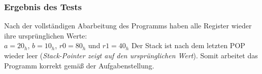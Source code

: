 \subsubsection{Ergebnis des Tests}
Nach der vollständigen Abarbeitung des Programms haben alle Register wieder ihre ursprünglichen Werte:\\
\(a = 20_h\), \(b = 10_h\), \(r0 = 80_h\) und \(r1 = 40_h\)
Der Stack ist nach dem letzten POP wieder leer (\textit{Stack-Pointer zeigt auf den ursprünglichen Wert}). Somit arbeitet das Programm korrekt gemäß der Aufgabenstellung.
\begin{center}
\end{center}

